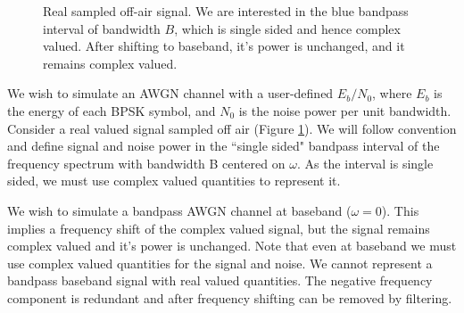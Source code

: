 \documentclass{article}
\begin{document}
\begin{figure}[H]
\caption{Real sampled off-air signal.  We are interested in the blue bandpass interval of bandwidth $B$, which is single sided and hence complex valued. After shifting to baseband, it's power is unchanged, and it remains complex valued.}
\vspace{5mm}
\label{fig:bandpass}
\begin{center}
\end{center}
\end{figure}

We wish to simulate an AWGN channel with a user-defined $E_b/N_0$, where $E_b$ is the energy of each BPSK symbol, and $N_0$ is the noise power per unit bandwidth.  Consider a real valued signal sampled off air (Figure \ref{fig:bandpass}).  We will follow convention and define signal and noise power in the ``single sided" bandpass interval of the frequency spectrum with bandwidth B centered on $\omega$.  As the interval is single sided, we must use complex valued quantities to represent it.

We wish to simulate a bandpass AWGN channel at baseband ($\omega=0$).  This implies a frequency shift of the complex valued signal, but the signal remains complex valued and it's power is unchanged. Note that even at baseband we must use complex valued quantities for the signal and noise.  We cannot represent a bandpass baseband signal with real valued quantities. The negative frequency component is redundant and after frequency shifting can be removed by filtering.  
\end{document}
